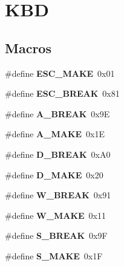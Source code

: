 \hypertarget{group__KBD}{}\section{K\+BD}
\label{group__KBD}
\subsection*{Macros}
\begin{DoxyCompactItemize}
\item 
\mbox{\label{group__KBD_ga168fd0a54619731c76c386a7f1bde2b1}} 
\#define {\bfseries E\+S\+C\+\_\+\+M\+A\+KE}~0x01
\item 
\mbox{\label{group__KBD_ga343f44cb034d2d2ff3438b3d45dcde1f}} 
\#define {\bfseries E\+S\+C\+\_\+\+B\+R\+E\+AK}~0x81
\item 
\mbox{\label{group__KBD_ga05826112c5acf959ee58dcacd8e9d065}} 
\#define {\bfseries A\+\_\+\+B\+R\+E\+AK}~0x9E
\item 
\mbox{\label{group__KBD_ga0f76fe84c649e8cf3a4114d0d9bf085a}} 
\#define {\bfseries A\+\_\+\+M\+A\+KE}~0x1E
\item 
\mbox{\label{group__KBD_gad2db9242348c43c781cc14746060470b}} 
\#define {\bfseries D\+\_\+\+B\+R\+E\+AK}~0x\+A0
\item 
\mbox{\label{group__KBD_ga629b0c93e278a4bf1e1678af58fbea95}} 
\#define {\bfseries D\+\_\+\+M\+A\+KE}~0x20
\item 
\mbox{\label{group__KBD_ga32d11f9abffe8bb3df11feef5ca5213d}} 
\#define {\bfseries W\+\_\+\+B\+R\+E\+AK}~0x91
\item 
\mbox{\label{group__KBD_gac822a3953d90207e64b58f480454a8d8}} 
\#define {\bfseries W\+\_\+\+M\+A\+KE}~0x11
\item 
\mbox{\label{group__KBD_ga85b3c65b8b6c952e08c252e9737b74f9}} 
\#define {\bfseries S\+\_\+\+B\+R\+E\+AK}~0x9F
\item 
\mbox{\label{group__KBD_gac2c2b345d42f2a5b5a028028eb8c5680}} 
\#define {\bfseries S\+\_\+\+M\+A\+KE}~0x1F

\end{DoxyCompactItemize}
